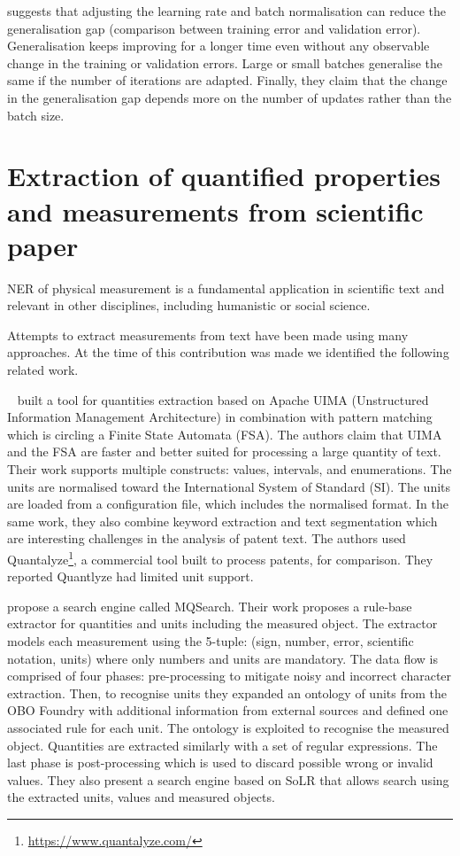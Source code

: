 \cite{hoffer2017train} suggests that adjusting the learning rate and batch normalisation can reduce the generalisation gap (comparison between training error and validation error). Generalisation keeps improving for a longer time even without any observable change in the training or validation errors. Large or small batches generalise the same if the number of iterations are adapted. 
Finally, they claim that the change in the generalisation gap depends more on the number of updates rather than the batch size. 


\section{Extraction of quantified properties and measurements from scientific paper} 
NER of physical measurement is a fundamental application in scientific text and relevant in other disciplines, including humanistic or social science. 

Attempts to extract measurements from text have been made using many approaches. At the time of this contribution was made we identified the following related work. 

~\cite{aras2014applications} built a tool for quantities extraction based on Apache UIMA (Unstructured Information Management Architecture) in combination with pattern matching which is circling a Finite State Automata (FSA). 
The authors claim that UIMA and the FSA are faster and better suited for processing a large quantity of text.
Their work supports multiple constructs: values, intervals, and enumerations. The units are normalised toward the International System of Standard (SI). 
The units are loaded from a configuration file, which includes the normalised format. In the same work, they also combine keyword extraction and text segmentation which are interesting challenges in the analysis of patent text. 
The authors used Quantalyze\footnote{\url{https://www.quantalyze.com/}}, a commercial tool built to process patents, for comparison. They reported Quantlyze had limited unit support. 

\cite{maiya2015mining} propose a search engine called MQSearch. Their work proposes a rule-base extractor for quantities and units including the measured object. The extractor models each measurement using the 5-tuple: (sign, number, error, scientific notation, units) where only numbers and units are mandatory. 
The data flow is comprised of four phases: pre-processing to mitigate noisy and incorrect character extraction. 
Then, to recognise units they expanded an ontology of units from the OBO Foundry with additional information from external sources and defined one associated rule for each unit. The ontology is exploited to recognise the measured object. 
Quantities are extracted similarly with a set of regular expressions. 
The last phase is post-processing which is used to discard possible wrong or invalid values. 
They also present a search engine based on SoLR that allows search using the extracted units, values and measured objects. 

